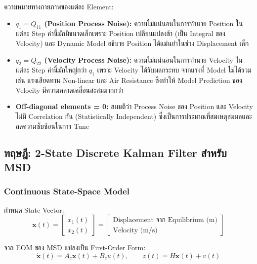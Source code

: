 ความหมายทางกายภาพของแต่ละ Element:
\begin{itemize}
    \item \textbf{$q_1 = Q_{11}$ (Position Process Noise):}
          ความไม่แน่นอนในการทำนาย Position ในแต่ละ Step
          ค่านี้มักมีขนาดเล็กเพราะ Position เปลี่ยนแปลงช้า
          (เป็น Integral ของ Velocity) และ Dynamic Model
          อธิบาย Position ได้แม่นยำในช่วง Displacement เล็ก

    \item \textbf{$q_2 = Q_{22}$ (Velocity Process Noise):}
          ความไม่แน่นอนในการทำนาย Velocity ในแต่ละ Step
          ค่านี้มักใหญ่กว่า $q_1$ เพราะ Velocity ได้รับผลกระทบ
          จากแรงที่ Model ไม่ได้รวม เช่น แรงเสียดทาน Non-linear
          และ Air Resistance ซึ่งทำให้ Model Prediction ของ Velocity
          มีความคลาดเคลื่อนสะสมมากกว่า

    \item \textbf{Off-diagonal elements = 0:}
          สมมติว่า Process Noise ของ Position และ Velocity
          ไม่มี Correlation กัน (Statistically Independent)
          ซึ่งเป็นการประมาณที่สมเหตุสมผลและลดความซับซ้อนในการ Tune
\end{itemize}

\subsection{ทฤษฎี: 2-State Discrete Kalman Filter สำหรับ MSD}

\subsubsection{Continuous State-Space Model}

กำหนด State Vector:
\begin{equation}
    \mathbf{x}(t) = \begin{bmatrix} x_1(t) \\ x_2(t) \end{bmatrix}
                  = \begin{bmatrix} \text{Displacement จาก Equilibrium (m)} \\
                                    \text{Velocity (m/s)} \end{bmatrix}
    \label{eq:state_vector}
\end{equation}

จาก EOM ของ MSD แปลงเป็น First-Order Form:
\begin{equation}
    \dot{\mathbf{x}}(t) = A_c \mathbf{x}(t) + B_c u(t), \qquad
    z(t) = H \mathbf{x}(t) + v(t)
    \label{eq:ss_cont}
\end{equation}

